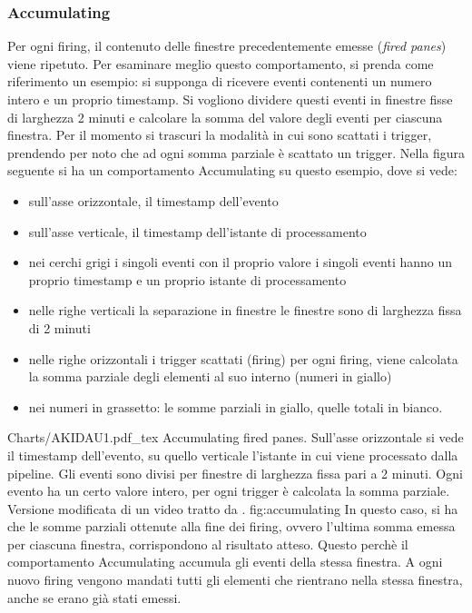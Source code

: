\subsubsection{Accumulating}
Per ogni firing, il contenuto delle finestre precedentemente emesse (\textit{fired panes}) viene ripetuto. Per esaminare meglio questo comportamento, si prenda come riferimento un esempio: si supponga di ricevere eventi contenenti un numero intero e un proprio timestamp. Si vogliono dividere questi eventi in finestre fisse di larghezza 2 minuti e calcolare la somma del valore degli eventi per ciascuna finestra. Per il momento si trascuri la modalità in cui sono scattati i trigger, prendendo per noto che ad ogni somma parziale è scattato un trigger. Nella figura seguente si ha un comportamento Accumulating su questo esempio, dove si vede:
\begin{itemize}
\item sull’asse orizzontale, il timestamp dell’evento
\item sull’asse verticale, il timestamp dell’istante di processamento
\item nei cerchi grigi i singoli eventi con il proprio valore
\subitem i singoli eventi hanno un proprio timestamp e un proprio istante di processamento
\item nelle righe verticali la separazione in finestre
\subitem le finestre sono di larghezza fissa di 2 minuti
\item nelle righe orizzontali i trigger scattati (firing)
\subitem per ogni firing, viene calcolata la somma parziale degli elementi al suo interno (numeri in giallo)
\item nei numeri in grassetto: le somme parziali in giallo, quelle totali in bianco.
\end{itemize}
\svg
{Charts/AKIDAU1.pdf_tex}
{Accumulating fired panes. Sull'asse orizzontale si vede il timestamp dell'evento, su quello verticale l'istante in cui viene processato dalla pipeline. Gli eventi sono divisi per finestre di larghezza fissa pari a 2 minuti. Ogni evento ha un certo valore intero, per ogni trigger è calcolata la somma parziale. Versione modificata di un video tratto da  \cite{akidau_chernyak_lax_2018}. }
{fig:accumulating}
In questo caso, si ha che le somme parziali ottenute alla fine dei firing, ovvero l'ultima somma emessa per ciascuna finestra, corrispondono al risultato atteso. Questo perchè il comportamento Accumulating accumula gli eventi della stessa finestra. A ogni nuovo firing vengono mandati tutti gli elementi che rientrano nella stessa finestra, anche se erano già stati emessi.
